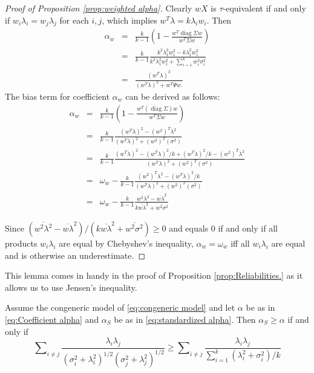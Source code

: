 \documentclass[twoside]{article}
\DeclareMathOperator{\diag}{diag}
\DeclareMathOperator{\tsum}{\textstyle \sum}
\renewcommand{\sqrt}[1]{{(#1)^{1/2}}}
\begin{document}
\begin{proof}[Proof of Proposition \ref{prop:weighted alpha}]
\label{proof:weighted alpha}Clearly $wX$ is $\tau$-equivalent
if and only if $w_{i}\lambda_{i}=w_{j}\lambda_{j}$ for each $i,j$,
which implies $w^{T}\lambda=k\lambda_{i}w_{i}$. Then
\begin{eqnarray*}
\alpha_{w} & = & \frac{k}{k-1}\left(1-\frac{w^{T}\diag\Sigma w}{w^{T}\Sigma w}\right)\\
 & = & \frac{k}{k-1}\frac{k^{2}\lambda_{1}^{2}w_{1}^{2}-k\lambda_{1}^{2}w_{1}^{2}}{k^{2}\lambda_{1}^{2}w_{1}^{2}+\tsum_{i=1}^{k}w_{i}^{2}\sigma_{i}^{2}}\\
 & = & \frac{(w^{T}\lambda)^{2}}{(w^{T}\lambda)^{2}+w^{T}\Psi w.}
\end{eqnarray*}
The bias term for coefficient $\alpha_w$ can be derived as follows:
\begin{eqnarray*}
\alpha_{w} & = & \frac{k}{k-1}(1-\frac{w^{T}(\diag\Sigma)w}{w^{T}\Sigma w})\\
 & = & \frac{k}{k-1}\frac{(w^{T}\lambda)^{2}-(w^{2})^{T}\lambda^{2}}{(w^{T}\lambda)^{2}+(w^{2})^{T}(\sigma^{2})}\\
 & = & \frac{k}{k-1}\frac{(w^{T}\lambda)^{2}-(w^{T}\lambda)^{2}/k+(w^{T}\lambda)^{2}/k-(w^{2})^{T}\lambda^{2}}{(w^{T}\lambda)^{2}+(w^{2})^{T}(\sigma^{2})}\\
 & = & \omega_{w}-\frac{k}{k-1}\frac{(w^{2})^{T}\lambda^{2}-(w^{T}\lambda)^{2}/k}{(w^{T}\lambda)^{2}+(w^{2})^{T}(\sigma^{2})}\\
 & = & \omega_{w}-\frac{k}{k-1}\frac{\overline{w^{2}\lambda^{2}}-\overline{w\lambda}^{2}}{k\overline{w\lambda}^{2}+\overline{w^{2}\sigma^{2}}}
\end{eqnarray*}

Since $(\overline{w^{2}\lambda^{2}}-\overline{w\lambda}^{2})/(k\overline{w\lambda}^{2}+\overline{w^{2}\sigma^{2}})\geq0$
and equals $0$ if and only if all products $w_i\lambda_i$ are equal by Chebyshev's inequality, $\alpha_w=\omega_w$
iff all $w_i\lambda_i$ are equal and is otherwise an underestimate. 


\end{proof}


This lemma comes in handy in the proof of Proposition \ref{prop:Reliabilities.} as it allows us to use Jensen's inequality.

\begin{lem}
Assume the congeneric model of \eqref{eq:congeneric model} and let $\alpha$ be as in \eqref{eq:Coefficient alpha} and $\alpha_S$ be as in \eqref{eq:standardized alpha}. Then $\alpha_S\geq\alpha$
if and only if
\begin{equation}
\label{eq:Alpha-alpha_s inequality}
\tsum_{i\neq j}\frac{\lambda_{i}\lambda_{j}}{\sqrt{\sigma_{i}^{2}+\lambda_{i}^{2}}\sqrt{\sigma_j^{2}+\lambda_{j}^{2}}} 
\geq
\tsum_{i\neq j}\frac{\lambda_{i}\lambda_{j}}{\tsum_{i=1}^{k}(\lambda_{i}^{2}+\sigma_{i}^{2})/k}
\end{equation}
\end{lem}
\end{document}
